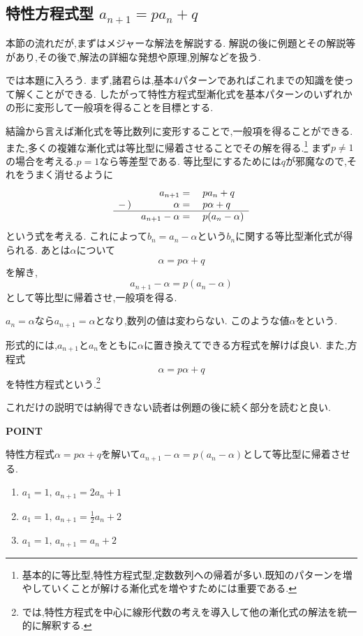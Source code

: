 
\subsection{\texorpdfstring{特性方程式型  $a_{n+1}=pa_n+q$}{特性方程式型}}\label{節：特性方程式型}
  本節の流れだが,まずはメジャーな解法を解説する.
  解説の後に例題とその解説等があり,その後で,解法の詳細な発想や原理,別解などを扱う.
  
  では本題に入ろう.
  まず,諸君らは,基本4パターンであればこれまでの知識を使って解くことができる.
  したがって特性方程式型漸化式を基本パターンのいずれかの形に変形して一般項を得ることを目標とする.
  
  結論から言えば漸化式を等比数列に変形することで,一般項を得ることができる.
  また,多くの複雑な漸化式は等比型に帰着させることでその解を得る.\footnote{基本的に等比型,特性方程式型,定数数列への帰着が多い.既知のパターンを増やしていくことが解ける漸化式を増やすためには重要である.}
  まず$p\ne1$の場合を考える.$p=1$なら等差型である.
  等比型にするためには$q$が邪魔なので,それをうまく消せるように
  \[
    \begin{array}{rrl}
      &a_{n+1}={}&pa_n+q\\
      -\,)&\alpha={}&p\alpha+q\\ \hline
      &a_{n+1}-\alpha={}&p(a_n-\alpha)
    \end{array}
  \]
  という式を考える.
  これによって$b_n=a_n-\alpha$という$b_n$に関する等比型漸化式が得られる.
  あとは$\alpha$について
  \[
    \alpha=p\alpha+q
  \]
  を解き,
  \[
    a_{n+1}-\alpha=p(a_n-\alpha)
  \]
  として等比型に帰着させ,一般項を得る.

  $a_n=\alpha$なら$a_{n+1}=\alpha$となり,数列の値は変わらない.
  このような値$\alpha$をという.

  形式的には,$a_{n+1}$と$a_n$をともに$\alpha$に置き換えてできる方程式を解けば良い.
  また,方程式
  \[
    \alpha=p\alpha+q
  \]
  を特性方程式という.\footnote{では,特性方程式を中心に線形代数の考えを導入して他の漸化式の解法を統一的に解釈する.}

  これだけの説明では納得できない読者は例題の後に続く部分を読むと良い.

  \begin{bookpoint}
    \textbf{POINT}\par
    特性方程式$\alpha=p\alpha+q$を解いて$a_{n+1}-\alpha=p(a_n-\alpha)$として等比型に帰着させる.
  \end{bookpoint}
  \noindent {}\par\nobreak
  \begin{enumerate}[label=(\arabic*),parsep=3pt,format=\bookitemlink{example-characteristic-1}{problem}{hint}]
    \item $a_1=1,\, a_{n+1}=2a_n+1$
    \item $a_1=1,\, a_{n+1}=\frac{1}{2}a_n+2$
    \item $a_1=1,\, a_{n+1}=a_n+2$
  \end{enumerate}
  
